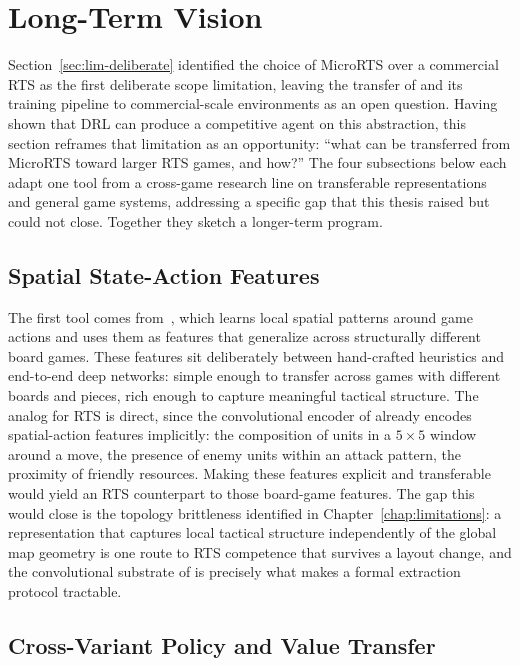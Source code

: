 \section{Long-Term Vision}
\label{sec:fw-long-term}

Section~\ref{sec:lim-deliberate} identified the choice of MicroRTS over a commercial RTS as the first deliberate scope limitation, leaving the transfer of  and its training pipeline to commercial-scale environments as an open question. Having shown that DRL can produce a competitive agent on this abstraction, this section reframes that limitation as an opportunity: ``what can be transferred from MicroRTS toward larger RTS games, and how?'' The four subsections below each adapt one tool from a cross-game research line on transferable representations and general game systems, addressing a specific gap that this thesis raised but could not close. Together they sketch a longer-term program.

\subsection{Spatial State-Action Features}

The first tool comes from~\cite{soemersSpatialStateactionFeatures2023}, which learns local spatial patterns around game actions and uses them as features that generalize across structurally different board games. These features sit deliberately between hand-crafted heuristics and end-to-end deep networks: simple enough to transfer across games with different boards and pieces, rich enough to capture meaningful tactical structure. The analog for RTS is direct, since the convolutional encoder of  already encodes spatial-action features implicitly: the composition of units in a $5\times 5$ window around a move, the presence of enemy units within an attack pattern, the proximity of friendly resources. Making these features explicit and transferable would yield an RTS counterpart to those board-game features. The gap this would close is the topology brittleness identified in Chapter~\ref{chap:limitations}: a representation that captures local tactical structure independently of the global map geometry is one route to RTS competence that survives a layout change, and the convolutional substrate of  is precisely what makes a formal extraction protocol tractable.

\subsection{Cross-Variant Policy and Value Transfer}
\label{sec:fw-long-term-transfer}


